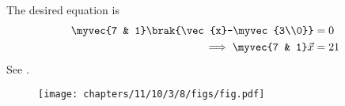 The desired equation is
		\begin{align}
			\myvec{7 & 1}\brak{\vec{x}-\myvec{3\\0}} &=0\\
		\implies 	\myvec{7 & 1}\vec{x} &= 21
		\end{align}
		See 
.
		\begin{figure}[H]
\begin{center}
\texttt{[image: chapters/11/10/3/8/figs/fig.pdf]}
\end{center}
\caption{}
\label{fig:chapters/11/10/3/8/Fig1}
\end{figure}
